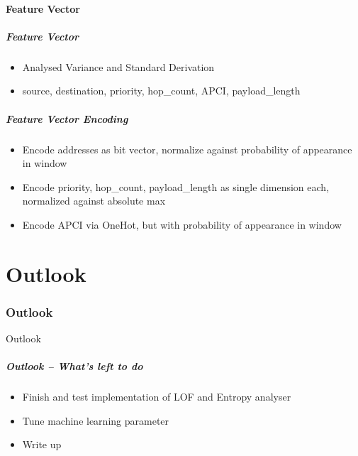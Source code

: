 \subsection{Feature Vector}
\begin{frame}[c]
	\frametitle{Feature Vector}
	
	\begin{itemize}
		\item Analysed Variance and Standard Derivation
		\item source, destination, priority, hop\_count, APCI, payload\_length
	\end{itemize}
\end{frame}

\begin{frame}[c]
	\frametitle{Feature Vector Encoding}
	
	\begin{itemize}
		\item Encode addresses as bit vector, normalize against probability of appearance in window
		\item Encode priority, hop\_count, payload\_length as single dimension each, normalized against absolute max
		\item Encode APCI via OneHot, but with probability of appearance in window
	\end{itemize}
\end{frame}

\part{Outlook}
\label{part:outlook}

\section{Outlook}
\begin{frame}[c]
	\centering
	\LARGE Outlook
\end{frame}

\begin{frame}[c]
	\frametitle{Outlook -- What's left to do}
	\begin{itemize}
		\item Finish and test implementation of LOF and Entropy analyser
		\item Tune machine learning parameter
		\item Write up
	\end{itemize}
\end{frame}
